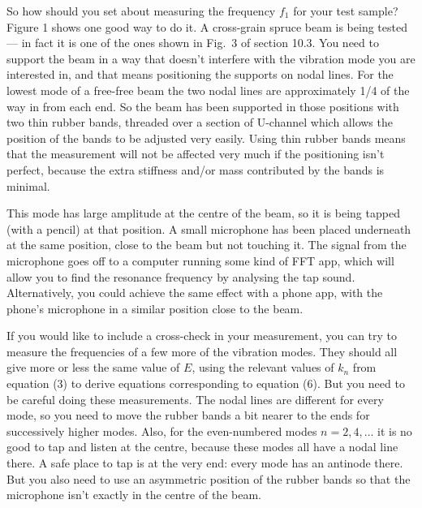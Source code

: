   So how should you set about measuring the frequency $f_1$ for your test 
  sample? Figure 1 shows one good way to do it. A cross-grain spruce beam is 
  being tested — in fact it is one of the ones shown in Fig.\ 3 of section 
  10.3. You need to support the beam in a way that doesn’t interfere with the 
  vibration mode you are interested in, and that means positioning the supports 
  on nodal lines. For the lowest mode of a free-free beam the two nodal lines 
  are approximately 1/4 of the way in from each end. So the beam has been 
  supported in those positions with two thin rubber bands, threaded over a 
  section of U-channel which allows the position of the bands to be adjusted 
  very easily. Using thin rubber bands means that the measurement will not be 
  affected very much if the positioning isn’t perfect, because the extra 
  stiffness and/or mass contributed by the bands is minimal. 


  This mode has large amplitude at the centre of the beam, so it is being 
  tapped (with a pencil) at that position. A small microphone has been placed 
  underneath at the same position, close to the beam but not touching it. The 
  signal from the microphone goes off to a computer running some kind of FFT 
  app, which will allow you to find the resonance frequency by analysing the 
  tap sound. Alternatively, you could achieve the same effect with a phone app, 
  with the phone’s microphone in a similar position close to the beam. 

  If you would like to include a cross-check in your measurement, you can try 
  to measure the frequencies of a few more of the vibration modes. They should 
  all give more or less the same value of $E$, using the relevant values of 
  $k_n$ from equation (3) to derive equations corresponding to equation (6). 
  But you need to be careful doing these measurements. The nodal lines are 
  different for every mode, so you need to move the rubber bands a bit nearer 
  to the ends for successively higher modes. Also, for the even-numbered modes 
  $n=2,4,…$ it is no good to tap and listen at the centre, because these modes 
  all have a nodal line there. A safe place to tap is at the very end: every 
  mode has an antinode there. But you also need to use an asymmetric position 
  of the rubber bands so that the microphone isn’t exactly in the centre of the 
  beam. 

